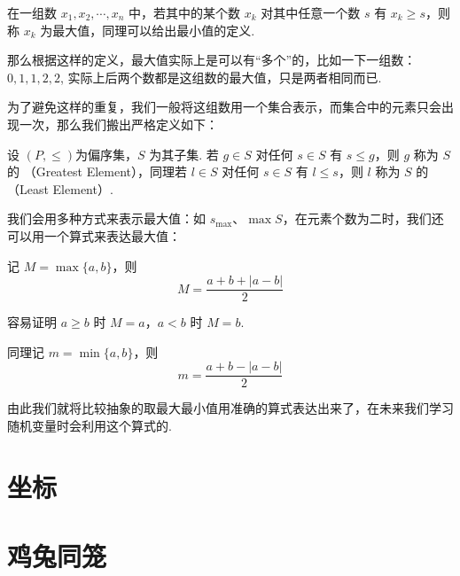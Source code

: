 在一组数 $x_1, x_2, \cdots, x_n$ 中，若其中的某个数 $x_k$ 对其中任意一个数 $s$ 有 $x_k \geqslant s$，则称 $x_k$ 为最大值，同理可以给出最小值的定义.

那么根据这样的定义，最大值实际上是可以有“多个”的，比如一下一组数：$0, 1, 1, 2, 2$, 实际上后两个数都是这组数的最大值，只是两者相同而已.

为了避免这样的重复，我们一般将这组数用一个集合表示，而集合中的元素只会出现一次，那么我们搬出严格定义如下：

\begin{definition}[最大元与最小元] \label{def:max-min-element}
  设 $(P,\leqslant )$为偏序集，$S$ 为其子集. 若 $g \in S$ 对任何 $s \in S$ 有 $s \leqslant g$，则 $g$ 称为 $S$ 的 （Greatest Element），同理若 $l \in S$ 对任何 $s \in S$ 有 $l \leqslant s$，则 $l$ 称为 $S$ 的 （Least Element）.
\end{definition}

我们会用多种方式来表示最大值：如 $s_{\max}$、$\max{S}$，在元素个数为二时，我们还可以用一个算式来表达最大值：

记 $M = \max{\{a, b\}}$，则
\begin{equation}
  M = \frac{a + b + |a - b|}{2} \label{eq:max}
\end{equation}

容易证明 $a \geqslant b$ 时 $M = a$，$a < b$ 时 $M = b$.

同理记 $m = \min{\{a, b\}}$，则
\begin{equation}
  m = \frac{a + b - |a - b|}{2} \label{eq:min}
\end{equation}

由此我们就将比较抽象的取最大最小值用准确的算式表达出来了，在未来我们学习随机变量时会利用这个算式的.

\section{坐标} \label{sec:coordinate}

\section{鸡兔同笼} \label{sec:chicken-rabbit}
